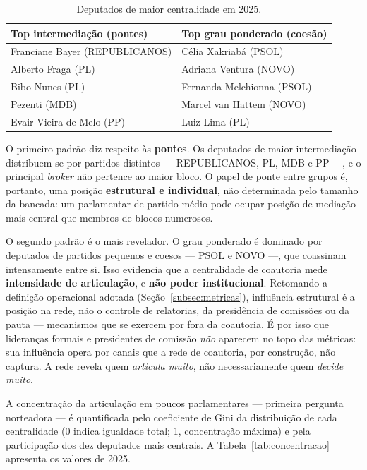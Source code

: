 \documentclass[
      12pt,
      a4paper,
      openright,
      oneside,
      chapter=TITLE,
      section=TITLE,
      english,
      french,
      spanish,
      brazilian
    ]{abntex2}
\begin{document}
    \begin{table}[H]
    \centering
    \caption{Deputados de maior centralidade em 2025.}
    \label{tab:top_deputados}
    \begin{tabular}{ll}
    \toprule
    \textbf{Top intermediação (pontes)} & \textbf{Top grau ponderado (coesão)} \\
    \midrule
    Franciane Bayer (REPUBLICANOS) & Célia Xakriabá (PSOL)       \\
    Alberto Fraga (PL)             & Adriana Ventura (NOVO)       \\
    Bibo Nunes (PL)                & Fernanda Melchionna (PSOL)   \\
    Pezenti (MDB)                  & Marcel van Hattem (NOVO)     \\
    Evair Vieira de Melo (PP)      & Luiz Lima (PL)               \\
    \bottomrule
    \end{tabular}
    \end{table}
    
    O primeiro padrão diz respeito às \textbf{pontes}. Os deputados de maior intermediação distribuem-se por partidos distintos --- REPUBLICANOS, PL, MDB e PP ---, e o principal \textit{broker} não pertence ao maior bloco. O papel de ponte entre grupos é, portanto, uma posição \textbf{estrutural e individual}, não determinada pelo tamanho da bancada: um parlamentar de partido médio pode ocupar posição de mediação mais central que membros de blocos numerosos.
    
    O segundo padrão é o mais revelador. O grau ponderado é dominado por deputados de partidos pequenos e coesos --- PSOL e NOVO ---, que coassinam intensamente entre si. Isso evidencia que a centralidade de coautoria mede \textbf{intensidade de articulação}, e \textbf{não poder institucional}. Retomando a definição operacional adotada (Seção~\ref{subsec:metricas}), influência estrutural é a posição na rede, não o controle de relatorias, da presidência de comissões ou da pauta --- mecanismos que se exercem por fora da coautoria. É por isso que lideranças formais e presidentes de comissão \emph{não} aparecem no topo das métricas: sua influência opera por canais que a rede de coautoria, por construção, não captura. A rede revela quem \emph{articula muito}, não necessariamente quem \emph{decide muito}.
    
    A concentração da articulação em poucos parlamentares --- primeira pergunta norteadora --- é quantificada pelo coeficiente de Gini \cite{gini1921} da distribuição de cada centralidade (0 indica igualdade total; 1, concentração máxima) e pela participação dos dez deputados mais centrais. A Tabela~\ref{tab:concentracao} apresenta os valores de 2025.
    
\end{document}
